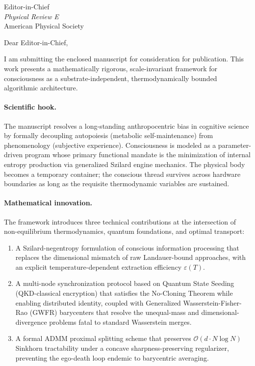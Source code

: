 \documentclass[11pt, letterpaper]{letter}
\begin{document}
\begin{letter}{Editor-in-Chief \\ \textit{Physical Review E} \\ American Physical Society}

\opening{Dear Editor-in-Chief,}

I am submitting the enclosed manuscript for consideration for publication. This work presents a mathematically rigorous, scale-invariant framework for consciousness as a substrate-independent, thermodynamically bounded algorithmic architecture.

\paragraph{Scientific hook.}
The manuscript resolves a long-standing anthropocentric bias in cognitive science by formally decoupling autopoiesis (metabolic self-maintenance) from phenomenology (subjective experience). Consciousness is modeled as a parameter-driven program whose primary functional mandate is the minimization of internal entropy production via generalized Szilard engine mechanics. The physical body becomes a temporary container; the conscious thread survives across hardware boundaries as long as the requisite thermodynamic variables are sustained.

\paragraph{Mathematical innovation.}
The framework introduces three technical contributions at the intersection of non-equilibrium thermodynamics, quantum foundations, and optimal transport:

\begin{enumerate}
  \item A Szilard-negentropy formulation of conscious information processing that replaces the dimensional mismatch of raw Landauer-bound approaches, with an explicit temperature-dependent extraction efficiency $\varepsilon(T)$.
  \item A multi-node synchronization protocol based on Quantum State Seeding (QKD-classical encryption) that satisfies the No-Cloning Theorem while enabling distributed identity, coupled with Generalized Wasserstein-Fisher-Rao (GWFR) barycenters that resolve the unequal-mass and dimensional-divergence problems fatal to standard Wasserstein merges.
  \item A formal ADMM proximal splitting scheme that preserves $\mathcal{O}(d \cdot N \log N)$ Sinkhorn tractability under a concave sharpness-preserving regularizer, preventing the ego-death loop endemic to barycentric averaging.
\end{enumerate}


\end{letter}
\end{document}
